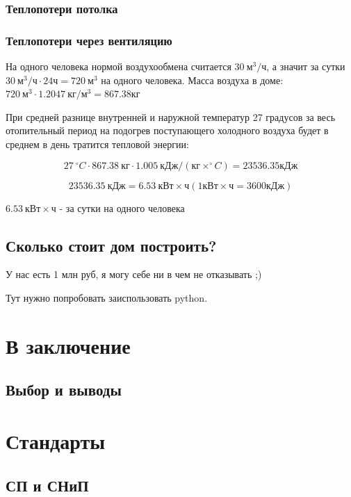 \documentclass[10pt, twocolumn]{report}
\begin{document}
\section{Теплопотери потолка}

\section{Теплопотери через вентиляцию}

На одного человека нормой воздухообмена считается $30\ \text{м}^3 / \text{ч}$, а значит за сутки $30\ \text{м}^3 / \text{ч} \cdot 24 \text{ч} = 720\ \text{м}^3$ на одного человека. Масса воздуха в доме: $ 720\ \text{м}^3 \cdot 1.2047\ \text{кг}/\text{м}^3 = 867.38 \text{кг} $

При средней разнице внутренней и наружной температур 27 градусов за весь отопительный период на подогрев поступающего холодного воздуха будет в среднем в день тратится тепловой энергии:

$$27\ ^{\circ}C \cdot 867.38\ \text{кг} \cdot 1.005\ \text{кДж}/(\text{кг}\times^{\circ}C) = 23536.35 \text{кДж}$$

$$23536.35\ \text{кДж} = 6.53\ \text{кВт}\times\text{ч} (1 \text{кВт}\times\text{ч} = 3600 \text{кДж})$$ 

$6.53\ \text{кВт}\times\text{ч}$ - за сутки на одного человека


\chapter{Сколько стоит дом построить?}
У нас есть 1 млн руб, я могу себе ни в чем не отказывать ;)

Тут нужно попробовать заиспользовать python.


\part{В заключение}

\chapter{Выбор и выводы}

\part{Стандарты}

\chapter{СП и СНиП}
\end{document}
